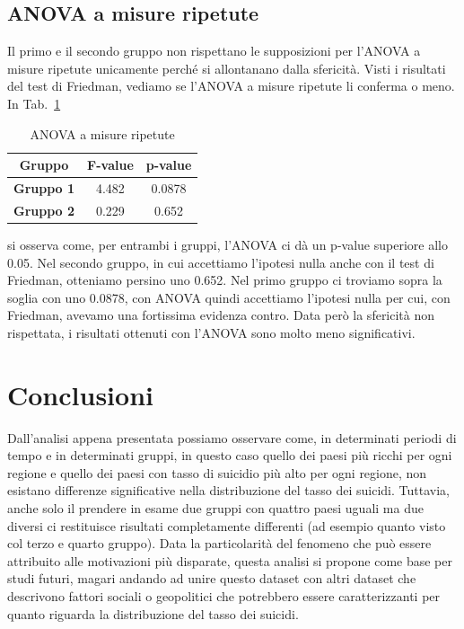 \documentclass[conference]{IEEEtran}
\begin{document}
\subsection{ANOVA a misure ripetute}

Il primo e il secondo gruppo non rispettano le supposizioni per l'ANOVA a misure ripetute
unicamente perché si allontanano dalla sfericità.
Visti i risultati del test di Friedman, vediamo se l'ANOVA a misure ripetute li conferma
o meno.
In Tab.~\ref{tab7} 
\begin{table}[htbp]
    \caption{ANOVA a misure ripetute}
    \begin{center}
    \begin{tabular}{|c|c|c|}
    \hline
    \textbf{Gruppo} & \textbf{F-value} & \textbf{p-value} \\
    \hline
    \textbf{Gruppo 1} & 4.482 & 0.0878 \\\cline{1-3}
    \textbf{Gruppo 2} & 0.229 & 0.652 \\\cline{1-3}
    \hline
    \end{tabular}
    \label{tab7}
    \end{center}
\end{table}
si osserva come, per entrambi i gruppi, l'ANOVA ci dà un p-value superiore allo 0.05.
Nel secondo gruppo, in cui accettiamo l'ipotesi nulla anche con il test di Friedman,
otteniamo persino uno 0.652.
Nel primo gruppo ci troviamo sopra la soglia con uno 0.0878, con ANOVA quindi
accettiamo l'ipotesi nulla per cui, con Friedman, avevamo una fortissima evidenza contro.
Data però la sfericità non rispettata, i risultati ottenuti con l'ANOVA sono molto
meno significativi.


\section{Conclusioni}

Dall'analisi appena presentata possiamo osservare come, in determinati periodi di tempo
e in determinati gruppi, in questo caso quello dei paesi più ricchi per ogni regione e
quello dei paesi con tasso di suicidio più alto per ogni regione, non esistano differenze
significative nella distribuzione del tasso dei suicidi.
Tuttavia, anche solo il prendere in esame due gruppi con quattro paesi uguali
ma due diversi ci restituisce risultati completamente differenti (ad esempio quanto
visto col terzo e quarto gruppo).
Data la particolarità del fenomeno che può essere attribuito alle motivazioni più disparate,
questa analisi si propone come base per studi futuri, magari andando ad unire questo dataset
con altri dataset che descrivono fattori sociali o geopolitici che potrebbero
essere caratterizzanti per quanto riguarda la distribuzione del tasso dei suicidi.
\end{document}
